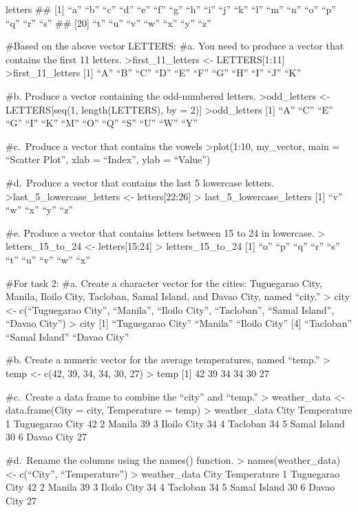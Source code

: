 \documentclass[
]{article}
\begin{document}
letters \#\# {[}1{]} ``a'' ``b'' ``c'' ``d'' ``e'' ``f'' ``g'' ``h''
``i'' ``j'' ``k'' ``l'' ``m'' ``n'' ``o'' ``p'' ``q'' ``r'' ``s'' \#\#
{[}20{]} ``t'' ``u'' ``v'' ``w'' ``x'' ``y'' ``z''

\#Based on the above vector LETTERS: \#a. You need to produce a vector
that contains the first 11 letters. \textgreater first\_11\_letters
\textless- LETTERS{[}1:11{]} \textgreater first\_11\_letters {[}1{]}
``A'' ``B'' ``C'' ``D'' ``E'' ``F'' ``G'' ``H'' ``I'' ``J'' ``K''

\#b. Produce a vector containing the odd-numbered letters.
\textgreater odd\_letters \textless- LETTERS{[}seq(1, length(LETTERS),
by = 2){]} \textgreater odd\_letters {[}1{]} ``A'' ``C'' ``E'' ``G''
``I'' ``K'' ``M'' ``O'' ``Q'' ``S'' ``U'' ``W'' ``Y''

\#c.~Produce a vector that contains the vowels \textgreater plot(1:10,
my\_vector, main = ``Scatter Plot'', xlab = ``Index'', ylab = ``Value'')

\#d.~Produce a vector that contains the last 5 lowercase letters.
\textgreater last\_5\_lowercase\_letters \textless- letters{[}22:26{]}
\textgreater{} last\_5\_lowercase\_letters {[}1{]} ``v'' ``w'' ``x''
``y'' ``z''

\#e. Produce a vector that contains letters between 15 to 24 in
lowercase. \textgreater{} letters\_15\_to\_24 \textless-
letters{[}15:24{]} \textgreater{} letters\_15\_to\_24 {[}1{]} ``o''
``p'' ``q'' ``r'' ``s'' ``t'' ``u'' ``v'' ``w'' ``x''

\#For task 2: \#a. Create a character vector for the cities: Tuguegarao
City, Manila, Iloilo City, Tacloban, Samal Island, and Davao City, named
``city.'' \textgreater{} city \textless- c(``Tuguegarao City'',
``Manila'', ``Iloilo City'', ``Tacloban'', ``Samal Island'', ``Davao
City'') \textgreater{} city {[}1{]} ``Tuguegarao City'' ``Manila''
``Iloilo City'' {[}4{]} ``Tacloban'' ``Samal Island'' ``Davao City''

\#b. Create a numeric vector for the average temperatures, named
``temp.'' \textgreater{} temp \textless- c(42, 39, 34, 34, 30, 27)
\textgreater{} temp {[}1{]} 42 39 34 34 30 27

\#c.~Create a data frame to combine the ``city'' and ``temp.''
\textgreater{} weather\_data \textless- data.frame(City = city,
Temperature = temp) \textgreater{} weather\_data City Temperature 1
Tuguegarao City 42 2 Manila 39 3 Iloilo City 34 4 Tacloban 34 5 Samal
Island 30 6 Davao City 27

\#d.~Rename the columns using the names() function. \textgreater{}
names(weather\_data) \textless- c(``City'', ``Temperature'')
\textgreater{} weather\_data City Temperature 1 Tuguegarao City 42 2
Manila 39 3 Iloilo City 34 4 Tacloban 34 5 Samal Island 30 6 Davao City
27
\end{document}
